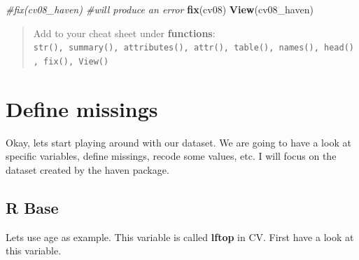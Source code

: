 \documentclass[
]{book}
\newenvironment{Shaded}{\begin{snugshade}}{\end{snugshade}}
\newcommand{\CommentTok}[1]{\textcolor[rgb]{0.56,0.35,0.01}{\textit{#1}}}
\newcommand{\DataTypeTok}[1]{\textcolor[rgb]{0.13,0.29,0.53}{#1}}
\newcommand{\KeywordTok}[1]{\textcolor[rgb]{0.13,0.29,0.53}{\textbf{#1}}}
\newcommand{\NormalTok}[1]{#1}
\newcommand{\OperatorTok}[1]{\textcolor[rgb]{0.81,0.36,0.00}{\textbf{#1}}}
\newcommand{\StringTok}[1]{\textcolor[rgb]{0.31,0.60,0.02}{#1}}
\begin{document}
\begin{Shaded}
\begin{Highlighting}[numbers=left,,]
\CommentTok{#fix(cv08_haven) #will produce an error}
\KeywordTok{fix}\NormalTok{(cv08)}
\KeywordTok{View}\NormalTok{(cv08_haven)}
\end{Highlighting}
\end{Shaded}

\begin{quote}
Add to your cheat sheet under \textbf{functions}: \texttt{str(),\ summary(),\ attributes(),\ attr(),\ table(),\ names(),\ head(),\ fix(),\ View()}
\end{quote}

\hypertarget{define-missings}{%
\section{Define missings}\label{define-missings}}

Okay, lets start playing around with our dataset. We are going to have a look at specific variables, define missings, recode some values, etc. I will focus on the dataset created by the haven package.

\hypertarget{r-base}{%
\subsection{R Base}\label{r-base}}

Lets use age as example. This variable is called \textbf{lftop} in CV. First have a look at this variable.

\begin{Shaded}
\end{Shaded}
\end{document}
